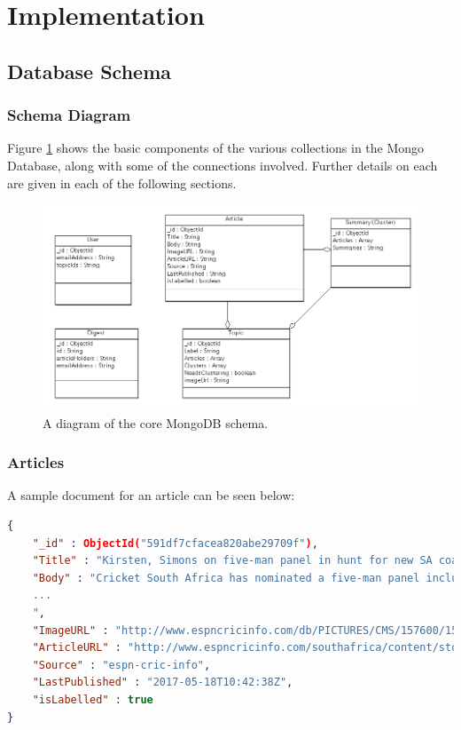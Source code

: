 \documentclass[12pt]{article}
\begin{document}

\newpage

\section{Implementation}

\subsection{Database Schema}

\subsubsection{Schema Diagram}

Figure \ref{dbschema} shows the basic components of the various collections in the Mongo Database, along with some of the connections involved. Further details on each are given in each of the following sections.

\begin{figure}[ht!]
  \centering
    \includegraphics[scale=0.5]{dbschema.png}
   \caption[A diagram of the MongoDB schema]{A diagram of the core MongoDB schema.}
   \label{dbschema}
\end{figure} 

\subsubsection{Articles}

A sample document for an article can be seen below:

\begin{lstlisting}[language=json, firstnumber=1, caption={A sample document in the Article table}]
{
    "_id" : ObjectId("591df7cfacea820abe29709f"),
    "Title" : "Kirsten, Simons on five-man panel in hunt for new SA coach",
    "Body" : "Cricket South Africa has nominated a five-man panel including two former national coaches, Gary Kirsten and Eric Simons, to recommend a suitable candidate for the position of head coach, which it aims to fill by the beginning of September
    ...
    ",
    "ImageURL" : "http://www.espncricinfo.com/db/PICTURES/CMS/157600/157626.5.jpg",
    "ArticleURL" : "http://www.espncricinfo.com/southafrica/content/story/1098337.html",
    "Source" : "espn-cric-info",
    "LastPublished" : "2017-05-18T10:42:38Z",
    "isLabelled" : true
}
\end{lstlisting}
\end{document}
